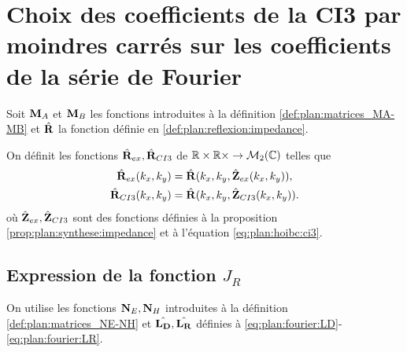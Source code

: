 \section[Choix 2 des coefficients de la CI3]{Choix des coefficients de la CI3 par moindres carrés sur les coefficients de la série de Fourier}

  Soit \(\mathbf{M}_A\) et \(\mathbf{M}_B\) les fonctions introduites à la définition \ref{def:plan:matrices_MA-MB} et \(\hat{\mathbf{R}}\) la fonction définie en \ref{def:plan:reflexion:impedance}.

  \begin{defn}%
    \label{def:plan:minimisation:matrices_MR}
    On définit les fonctions \(\hat{\mathbf{R}}_{ex}, \hat{\mathbf{R}}_{CI3}\) de \(\mathbb R\times\mathbb R\times \rightarrow \mathcal{M}_2(\mathbb C)\) telles que
    \begin{align*}
      \hat{\mathbf{R}}_{ex}(k_x,k_y) &= \hat{\mathbf{R}}(k_x,k_y, \hat{\mathbf{Z}}_{ex}(k_x,k_y)),
      \\
      \hat{\mathbf{R}}_{CI3}(k_x,k_y) &= \hat{\mathbf{R}}(k_x,k_y, \hat{\mathbf{Z}}_{CI3}(k_x,k_y)).
    \end{align*}
    où \(\hat{\mathbf{Z}}_{ex},\hat{\mathbf{Z}}_{CI3}\) sont des fonctions définies à la proposition \ref{prop:plan:synthese:impedance} et à l'équation \eqref{eq:plan:hoibc:ci3}.
  \end{defn}

  \subsection[Expression de la fonction JR]{Expression de la fonction \(J_R\)}

    On utilise les fonctions \(\mathbf{N}_E, \mathbf{N}_H\) introduites à la définition \ref{def:plan:matrices_NE-NH} et \(\hat{\mathbf{L_D}},\hat{\mathbf{L_R}}\) définies à \ref{eq:plan:fourier:LD}-\ref{eq:plan:fourier:LR}.

